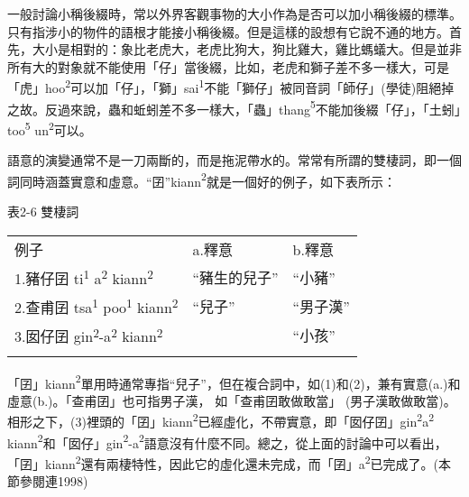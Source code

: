 \textrm{一般討論小稱後綴時，常以外界客觀事物的大小作為是否可以加小稱後綴的標準。只有指涉小的物件的語根才能接小稱後綴。但是這樣的設想有它說不通的地方。首先，大小是相對的：象比老虎大，老虎比狗大，狗比雞大，雞比螞蟻大。但是並非所有大的對象就不能使用「仔」當後綴，比如，老虎和獅子差不多一樣大，可是「虎」hoo}\textrm{\textsuperscript{2}}\textrm{可以加「仔」，「獅」sai}\textrm{\textsuperscript{1}}\textrm{不能「獅仔」被同音詞「師仔」(學徒)阻絕掉之故。反過來說，蟲和蚯蚓差不多一樣大，「蟲」thang}\textrm{\textsuperscript{5}}\textrm{不能加後綴「仔」，「土蚓」too}\textrm{\textsuperscript{5}} \textrm{un}\textrm{\textsuperscript{2}}\textrm{可以。}

\textrm{語意的演變通常不是一刀兩斷的，而是拖泥帶水的。常常有所謂的雙棲詞，即一個詞同時涵蓋實意和虛意。``囝''kiann}\textrm{\textsuperscript{2}}\textrm{就是一個好的例子，如下表所示：}

表2-6 雙棲詞

\tablefirsthead{}

\tabletail{}
\tablelasttail{}
\begin{tabularx}{\textwidth}{XXX}
\lsptoprule

 例子 & a.釋意 & b.釋意\\
{\sffamily \textrm{1.豬仔囝 ti}\textrm{\textsuperscript{1}} \textrm{a}\textrm{\textsuperscript{2}} \textrm{kiann}\textrm{\textsuperscript{2}}} & ``豬生的兒子'' & ``小豬''\\
{\sffamily \textrm{2.查甫囝 tsa}\textrm{\textsuperscript{1} }\textrm{poo}\textrm{\textsuperscript{1}} \textrm{kiann}\textrm{\textsuperscript{2}}} & ``兒子'' & ``男子漢''\\
{\sffamily \textrm{3.囡仔囝 gin}\textrm{\textsuperscript{2}}\textrm{{}-a}\textrm{\textsuperscript{2}} \textrm{kiann}\textrm{\textsuperscript{2}}} &  & ``小孩''\\
\lspbottomrule
\end{tabularx}
\textrm{「囝」kiann}\textrm{\textsuperscript{2}}\textrm{單用時通常專指``兒子''}，\textrm{但在複合詞中，如(1)和(2)}，\textrm{兼有實意(a.)和虛意(b.)}。\textrm{「查甫囝」也可指男子漢， 如「查甫囝敢做敢當」 (男子漢敢做敢當)。相形之下，(3)裡頭的「囝」kiann}\textrm{\textsuperscript{2}}\textrm{已經虛化，不帶實意，即「囡仔囝」gin}\textrm{\textsuperscript{2}}\textrm{a}\textrm{\textsuperscript{2}} \textrm{kiann}\textrm{\textsuperscript{2}}\textrm{和「囡仔」gin}\textrm{\textsuperscript{2}}\textrm{{}-a}\textrm{\textsuperscript{2}}\textrm{語意沒有什麼不同。總之，從上面的討論中可以看出，「囝」kiann}\textrm{\textsuperscript{2}}\textrm{還有兩棲特性，因此它的虛化還未完成，而「囝」a}\textrm{\textsuperscript{2}}\textrm{已完成了。(本節參閱連1998)}

